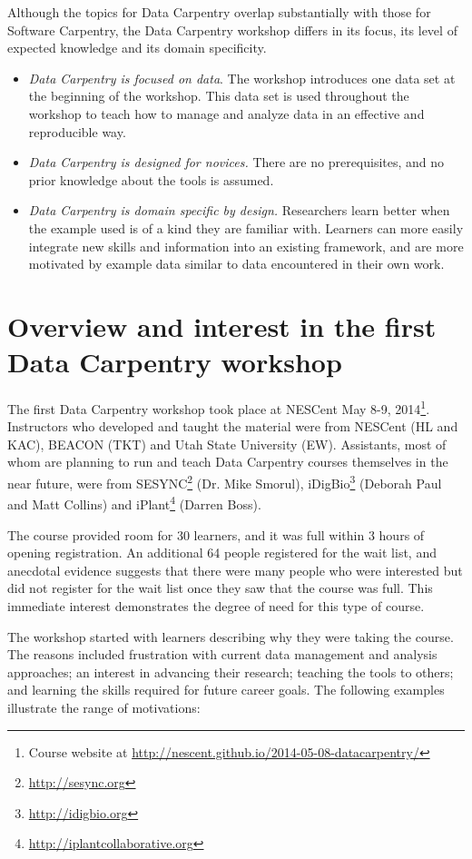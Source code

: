 \documentclass[11pt]{article}
\begin{document}
Although the topics for Data Carpentry overlap substantially with
those for Software Carpentry, the Data Carpentry workshop differs in
its focus, its level of expected knowledge and its domain specificity.
\begin{itemize}
\item \emph{Data Carpentry is focused on data}. The workshop introduces one data set at the beginning of the
workshop. This data set is used throughout the workshop to teach how to manage and analyze data in an effective and reproducible way.
\item \emph{Data Carpentry is designed for novices.} There are no prerequisites, and no 
prior knowledge about the tools is assumed.
\item \emph{Data Carpentry is domain specific by design.} Researchers learn better when the example used is
of a kind they are familiar with. Learners can more easily integrate new skills and information into an existing framework, and 
are more motivated by example data similar to data encountered in their own work.
\end{itemize}

\section{Overview and interest in the first Data Carpentry workshop}

The first Data Carpentry workshop took place at NESCent May 8-9, 2014\footnote{Course website at \url{http://nescent.github.io/2014-05-08-datacarpentry/}}. Instructors who developed and taught the material were from NESCent
(HL and KAC), BEACON (TKT) and Utah State University (EW). Assistants, most of whom are planning to run and teach Data Carpentry courses themselves in the near future, were  from SESYNC\footnote{\url{http://sesync.org}} (Dr. Mike Smorul), iDigBio\footnote{\url{http://idigbio.org}} (Deborah Paul
and Matt Collins) and iPlant\footnote{\url{http://iplantcollaborative.org}} (Darren Boss).

The course provided room for 30 learners, and it was full within 3 hours of opening registration. An additional 64 people registered for the wait list, and anecdotal evidence suggests that there were many people who were interested but did not register for the wait list once they saw that the course was full. This immediate interest demonstrates the degree of need for this type of course.

The workshop started with learners describing why they were taking the course. The reasons included frustration with current data management and analysis approaches; an interest in advancing their research; teaching the tools to others; and learning the skills required for future career goals. The following examples illustrate the range of motivations:
\end{document}
